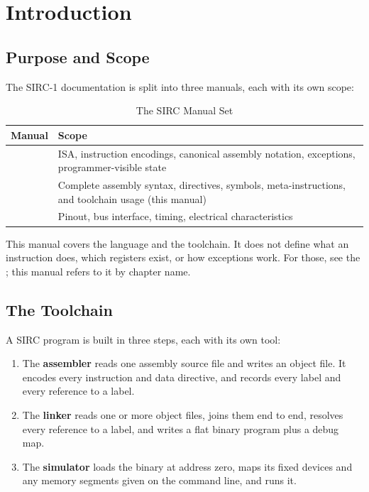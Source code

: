 \chapter{Introduction}
\label{ch:introduction}

\section{Purpose and Scope}

The SIRC-1 documentation is split into three manuals, each with its own scope:

\begin{table}[H]
	\centering
	\begin{tabular}{lp{9cm}}
		\toprule
		\textbf{Manual} & \textbf{Scope}                                                                                      \\
		\midrule
		\archmanual{}   & ISA, instruction encodings, canonical assembly notation, exceptions, programmer-visible state       \\
		\asmmanual{}    & Complete assembly syntax, directives, symbols, meta-instructions, and toolchain usage (this manual) \\
		\hwmanual{}     & Pinout, bus interface, timing, electrical characteristics                                           \\
		\bottomrule
	\end{tabular}
	\caption{The SIRC Manual Set}
	\label{tab:manual-set}
\end{table}

This manual covers the language and the toolchain. It does not define what an instruction does, which registers exist,
or how exceptions work. For those, see the \archmanual{}; this manual refers to it by chapter name.

\section{The Toolchain}

A SIRC program is built in three steps, each with its own tool:

\begin{enumerate}
	\item The \textbf{assembler} reads one assembly source file and writes an object file. It encodes every instruction and data
	      directive, and records every label and every reference to a label.
	\item The \textbf{linker} reads one or more object files, joins them end to end, resolves every reference to a label, and
	      writes a flat binary program plus a debug map.
	\item The \textbf{simulator} loads the binary at address zero, maps its fixed devices and any memory segments given on the
	      command line, and runs it.
\end{enumerate}

